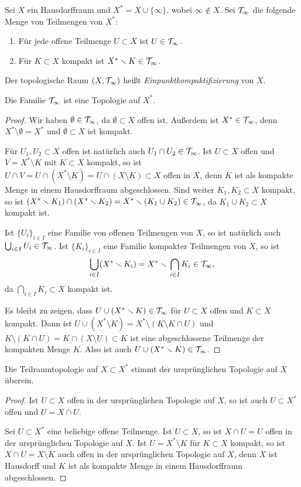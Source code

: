 \begin{definition}
Sei $X$ ein Hausdorffraum und $X^* = X\cup\{\infty\}$, wobei $\infty\not\in X$. Sei $\cal T_\infty$ die folgende Menge von Teilmengen von $X^*$:
\begin{enumerate}
\item Für jede offene Teilmenge $U\subset X$ ist $U\in\cal T_\infty$.
\item Für $K\subset X$ kompakt ist $X^*\setminus K\in\cal T_\infty$.
\end{enumerate}
Der topologische Raum $(X,\cal T_\infty)$ heißt \emph{Einpunktkompaktifizierung} von $X$.
\end{definition}

\begin{lemma}
Die Familie $\cal T_\infty$ ist eine Topologie auf $X^*$.
\end{lemma}
\begin{proof}
Wir haben $\emptyset\in\cal T_\infty$, da $\emptyset\subset X$ offen ist. Außerdem ist $X^*\in\cal T_\infty$, denn $X^*\setminus \emptyset = X^*$ und $\emptyset\subset X$ ist kompakt.

Für $U_1,U_2\subset X$ offen ist natürlich auch $U_1\cap U_2\in\cal T_\infty$. Ist $U\subset X$ offen und $V = X^*\setminus K$ mit $K\subset X$ kompakt, so ist $U\cap V = U\cap (X^*\setminus K) = U\cap (X\setminus K)\subset X$ offen in $X$, denn $K$ ist als kompakte Menge in einem Hausdorffraum abgeschlossen. Sind weiter $K_1,K_2\subset X$ kompakt, so ist $(X^*\setminus K_1)\cap (X^*\setminus K_2) = X^*\setminus (K_1\cup K_2)\in\cal T_\infty$, da $K_1\cup K_2\subset X$ kompakt ist.

Ist $\{U_i\}_{i\in I}$ eine Familie von offenen Teilmengen von $X$, so ist natürlich auch $\bigcup_{i\in I} U_i\in\cal T_\infty$. Ist $\{K_i\}_{i\in I}$ eine Familie kompakter Teilmengen von $X$, so ist
\[
\bigcup_{i\in I} (X^*\setminus K_i) = X^*\setminus \bigcap_{i\in I} K_i \in \cal T_\infty,
\]
da $\bigcap_{i\in I} K_i\subset X$ kompakt ist.

Es bleibt zu zeigen, dass $U\cup (X^*\setminus K)\in\cal T_\infty$ für $U\subset X$ offen und $K\subset X$ kompakt. Dann ist $U\cup (X^*\setminus K) = X^*\setminus (K\setminus K\cap U)$ und $K\setminus (K\cap U) = K\cap (X\setminus U)\subset K$ ist eine abgeschlossene Teilmenge der kompakten Menge $K$. Also ist auch $U\cup (X^*\setminus K)\in\cal T_\infty$.
\end{proof}
\begin{lemma}
Die Teilraumtopologie auf $X\subset X^*$ stimmt der ursprünglichen Topologie auf $X$ überein.
\end{lemma}
\begin{proof}
Ist $U\subset X$ offen in der ursprünglichen Topologie auf $X$, so ist auch $U\subset X^*$ offen und $U = X\cap U$.

Sei $U\subset X^*$ eine beliebige offene Teilmenge. Ist $U\subset X$, so ist $X\cap U = U$ offen in der ursprünglichen Topologie auf $X$. Ist $U = X^*\setminus K$ für $K\subset X$ kompakt, so ist $X\cap U = X\setminus K$ auch offen in der ursprünglichen Topologie auf $X$, denn $X$ ist Hausdorff und $K$ ist als kompakte Menge in einem Hausdorffraum abgeschlossen.
\end{proof}

